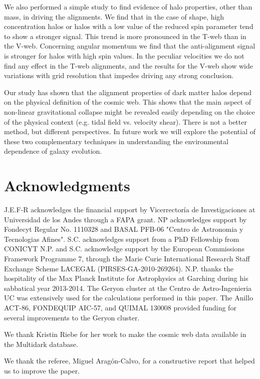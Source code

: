\documentclass[useAMS,usenatbib]{mn2e}
\begin{document}
We also performed a simple study to find evidence of halo properties,
other than mass, in driving the alignments. We find that in the case of
shape, high concentration halos or halos with a low value of
the reduced spin parameter tend to show a stronger signal. This trend is
more pronounced in the T-web than in the V-web. Concerning angular
momentum we find that the anti-alignment signal is stronger for halos
with high spin values. In the peculiar velocities we do not find any
effect in the T-web alignments, and the results for the V-web show 
wide variations with grid resolution that impedes driving any strong
conclusion.

Our study has shown that the alignment properties of dark matter
halos depend on the physical definition of the cosmic web. This shows
that the main aspect of non-linear gravitational collapse might be
revealed easily depending on the choice of the physical context
(e.g. tidal field vs. velocity shear). There is not a better method,
but different perspectives. In future work we will explore the
potential of these two complementary techniques in understanding the
environmental dependence of galaxy evolution.

\section*{Acknowledgments}

J.E.F-R acknowledges the financial support by Vicerrector\'ia de
Investigaciones at Universidad de los Andes through a FAPA grant.
NP acknowledges support by Fondecyt Regular No. 1110328 and BASAL PFB-06 "Centro de Astronomia y Tecnologias Afines".
S.C. acknowledges support from a PhD Fellowship from CONICYT
N.P. and S.C. acknowledge support by the European Commissions Framework
Programme 7, through the Marie Curie International Research Staff
Exchange Scheme LACEGAL (PIRSES-GA-2010-269264). N.P. thanks the
hospitality of the Max Planck Institute for Astrophysics at Garching
during his sabbatical year 2013-2014. The Geryon cluster at the Centro de Astro-Ingenieria UC was extensively used for the calculations performed in this paper.
The Anillo ACT-86, FONDEQUIP AIC-57, and QUIMAL 130008 provided
funding for several improvements to the Geryon cluster.


We thank Kristin Riebe for her work to make the cosmic web data available in the Multidark database. 

We thank the referee, Miguel Arag\'on-Calvo, for a constructive report
that helped us to improve the paper.  
\end{document}

